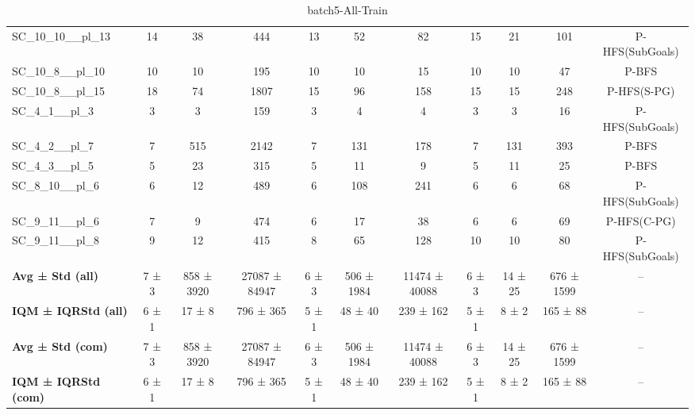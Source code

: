 \begin{table}[!ht]
\begin{tabular}{l|ccc|ccc|cccc}
SC\_10\_10\_\_pl\_13 & 14 & 38 & 444 & 13 & 52 & 82 & 15 & 21 & 101 & P-HFS(SubGoals) \\
SC\_10\_8\_\_pl\_10 & 10 & 10 & 195 & 10 & 10 & 15 & 10 & 10 & 47 & P-BFS \\
SC\_10\_8\_\_pl\_15 & 18 & 74 & 1807 & 15 & 96 & 158 & 15 & 15 & 248 & P-HFS(S-PG) \\
SC\_4\_1\_\_pl\_3 & 3 & 3 & 159 & 3 & 4 & 4 & 3 & 3 & 16 & P-HFS(SubGoals) \\
SC\_4\_2\_\_pl\_7 & 7 & 515 & 2142 & 7 & 131 & 178 & 7 & 131 & 393 & P-BFS \\
SC\_4\_3\_\_pl\_5 & 5 & 23 & 315 & 5 & 11 & 9 & 5 & 11 & 25 & P-BFS \\
SC\_8\_10\_\_pl\_6 & 6 & 12 & 489 & 6 & 108 & 241 & 6 & 6 & 68 & P-HFS(SubGoals) \\
SC\_9\_11\_\_pl\_6 & 7 & 9 & 474 & 6 & 17 & 38 & 6 & 6 & 69 & P-HFS(C-PG) \\
SC\_9\_11\_\_pl\_8 & 9 & 12 & 415 & 8 & 65 & 128 & 10 & 10 & 80 & P-HFS(SubGoals) \\
\hline
\textbf{Avg ± Std (all)} & 7 ± 3 & 858 ± 3920 & 27087 ± 84947 & 6 ± 3 & 506 ± 1984 & 11474 ± 40088 & 6 ± 3 & 14 ± 25 & 676 ± 1599 & -- \\
\textbf{IQM ± IQRStd (all)} & 6 ± 1 & 17 ± 8 & 796 ± 365 & 5 ± 1 & 48 ± 40 & 239 ± 162 & 5 ± 1 & 8 ± 2 & 165 ± 88 & -- \\
\textbf{Avg ± Std (com)} & 7 ± 3 & 858 ± 3920 & 27087 ± 84947 & 6 ± 3 & 506 ± 1984 & 11474 ± 40088 & 6 ± 3 & 14 ± 25 & 676 ± 1599 & -- \\
\textbf{IQM ± IQRStd (com)} & 6 ± 1 & 17 ± 8 & 796 ± 365 & 5 ± 1 & 48 ± 40 & 239 ± 162 & 5 ± 1 & 8 ± 2 & 165 ± 88 & -- \\
\end{tabular}
\caption{batch5-All-Train}
\label{tab:batch5_All_comparison_train}
\end{table}

